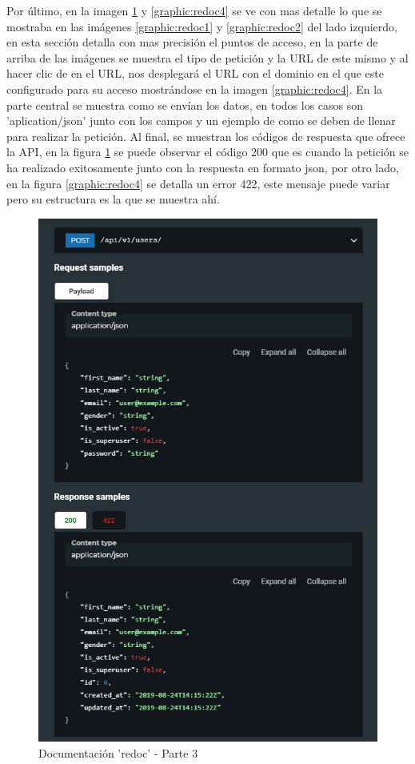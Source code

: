 Por último, en la imagen \ref{graphic:redoc3} y \ref{graphic:redoc4} se ve con mas detalle lo que se mostraba en las imágenes \ref{graphic:redoc1} y \ref{graphic:redoc2} del lado izquierdo, en esta sección detalla con mas precisión el puntos de acceso, en la parte de arriba de las imágenes se muestra el tipo de petición y la URL de este mismo y al hacer clic de en el URL, nos desplegará el URL con el dominio en el que este configurado para su acceso mostrándose en la imagen \ref{graphic:redoc4}. En la parte central se muestra como se envían los datos, en todos los casos son 'aplication/json' junto con los campos y un ejemplo de como se deben de llenar para realizar la petición. Al final, se muestran los códigos de respuesta que ofrece la API, en la figura \ref{graphic:redoc3} se puede observar el código 200 que es cuando la petición se ha realizado exitosamente junto con la respuesta en formato json, por otro lado, en la figura \ref{graphic:redoc4} se detalla un error 422, este mensaje puede variar pero su estructura es la que se muestra ahí.

\begin{figure}[!htb]
    \centering
    \includegraphics[scale=.40]{TT/img/implementacion/redoc_3.png}
    \caption{Documentación 'redoc' - Parte 3}
    \label{graphic:redoc3}
\end{figure}

